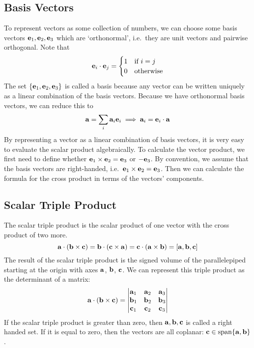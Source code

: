 \subsection{Basis Vectors}
To represent vectors as some collection of numbers, we can choose some basis vectors \(\vb e_1, \vb e_2, \vb e_3\) which are `orthonormal', i.e.\ they are unit vectors and pairwise orthogonal. Note that
\[ \vb e_i \cdot \vb e_j = \begin{cases}
		1 & \text{if } i = j \\
		0 & \text{otherwise}
	\end{cases} \]
The set \(\{ \vb e_1, \vb e_2, \vb e_3 \}\) is called a basis because any vector can be written uniquely as a linear combination of the basis vectors. Because we have orthonormal basis vectors, we can reduce this to
\[ \vb a = \sum_i \vb a_i \vb e_i \implies \vb a_i = \vb e_i \cdot \vb a \]
By representing a vector as a linear combination of basis vectors, it is very easy to evaluate the scalar product algebraically. To calculate the vector product, we first need to define whether \(\vb e_1 \times \vb e_2 = \vb e_3\) or \(-\vb e_3\). By convention, we assume that the basis vectors are right-handed, i.e.\ \(\vb e_1 \times \vb e_2 = \vb e_3\). Then we can calculate the formula for the cross product in terms of the vectors' components.

\subsection{Scalar Triple Product}
The scalar triple product is the scalar product of one vector with the cross product of two more.
\[ \vb a \cdot (\vb b \times \vb c) = \vb b \cdot (\vb c \times \vb a) = \vb c \cdot (\vb a \times \vb b) = [\vb a, \vb b, \vb c] \]
The result of the scalar triple product is the signed volume of the parallelepiped starting at the origin with axes \(\vb a\), \(\vb b\), \(\vb c\). We can represent this triple product as the determinant of a matrix:
\[
	\vb a \cdot (\vb b \times \vb c) =
	\begin{vmatrix}
		\vb a_1 & \vb a_2 & \vb a_3 \\
		\vb b_1 & \vb b_2 & \vb b_3 \\
		\vb c_1 & \vb c_2 & \vb c_3
	\end{vmatrix}
\]
If the scalar triple product is greater than zero, then \(\vb a, \vb b, \vb c\) is called a right handed set. If it is equal to zero, then the vectors are all coplanar: \(\vb c \in \operatorname{span} \{ \vb a, \vb b \}\).

